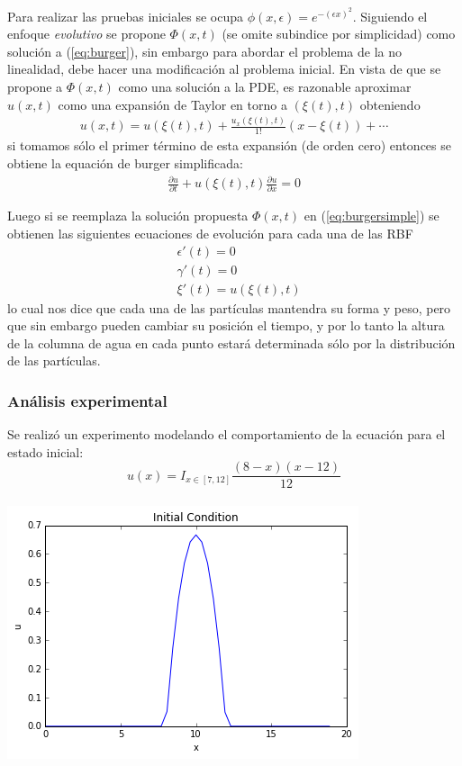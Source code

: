 ﻿\documentclass[spanish, fleqn]{article}
\begin{document}
    Para realizar las pruebas iniciales se ocupa $\displaystyle \phi(x,\epsilon) = e^{-(\epsilon x)^2}$. Siguiendo el enfoque \textit{evolutivo} se propone $\Phi(x,t)$ (se omite subindice por simplicidad) como solución a (\ref{eq:burger}), sin embargo para abordar el problema de la no linealidad, debe hacer una modificación al problema inicial. En vista de que se propone a $\Phi(x,t)$ como una solución a la PDE, es razonable aproximar $u(x,t)$ como una expansión de Taylor en torno a $(\xi(t),t)$ obteniendo
    \begin{align}
      u(x,t) = u(\xi(t),t) + \frac{u_x(\xi(t),t)}{1!}(x-\xi(t)) + \cdots
    \end{align}
    si tomamos sólo el primer término de esta expansión (de orden cero) entonces se obtiene la equación de burger simplificada:
    \begin{align}
      \frac{\partial u}{\partial t} + u(\xi(t),t)\frac{\partial u}{\partial x} = 0
      \label{eq:burgersimple}
    \end{align}

    Luego si se reemplaza la solución propuesta $\Phi(x,t)$ en (\ref{eq:burgersimple}) se obtienen las siguientes ecuaciones de evolución para cada una de las RBF
    \begin{align*}
    & \epsilon'(t) = 0 \\
    & \gamma'(t) = 0  \\
    & \xi'(t) = u(\xi(t),t) 
    \end{align*}
    lo cual nos dice que cada una de las partículas mantendra su forma y peso, pero que sin embargo pueden cambiar su posición el tiempo, y por lo tanto la altura de la columna de agua en cada punto estará determinada sólo por la distribución de las partículas.


    \subsubsection{Análisis experimental}
    Se realizó un experimento modelando el comportamiento de la ecuación para el estado inicial:
    \begin{equation*}
      u(x) = I_{x \in [7,12]}\frac{(8-x)(x-12)}{12}
    \end{equation*} \\
    \includegraphics[scale=0.6]{initialu.png} \\
\end{document}
